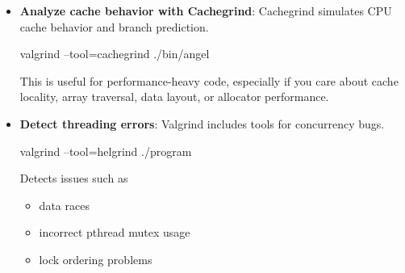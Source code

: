 \documentclass{report}
\begin{document}
\begin{itemize}
\begin{itemize}
                        \bigbreak \noindent 
                        This helps answer:
                        \begin{itemize}
                            \item Which functions are called the most?
                            \item Where is CPU time being spent?
                            \item What call paths are expensive?
                        \end{itemize}
                    \item \textbf{Analyze cache behavior with Cachegrind}: Cachegrind simulates CPU cache behavior and branch prediction.
                        \bigbreak \noindent 
                        \begin{bashcode}
                            valgrind --tool=cachegrind ./bin/angel
                        \end{bashcode}
                        \bigbreak \noindent 
                        This is useful for performance-heavy code, especially if you care about cache locality, array traversal, data layout, or allocator performance.
                    \item \textbf{Detect threading errors}: Valgrind includes tools for concurrency bugs.
                        \bigbreak \noindent 
                        \begin{bashcode}
                        valgrind --tool=helgrind ./program
                        \end{bashcode}
                        \bigbreak \noindent 
                        Detects issues such as 
                        \begin{itemize}
                            \item data races
                            \item incorrect pthread mutex usage
                            \item lock ordering problems
                        \end{itemize}
                \end{itemize}





        \end{itemize}

        \pagebreak 
\end{document}
